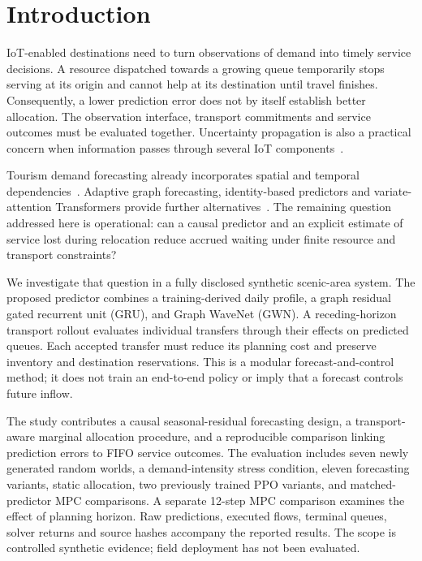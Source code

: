 \section{Introduction}
IoT-enabled destinations need to turn observations of demand into timely service decisions. A resource dispatched towards a growing queue temporarily stops serving at its origin and cannot help at its destination until travel finishes. Consequently, a lower prediction error does not by itself establish better allocation. The observation interface, transport commitments and service outcomes must be evaluated together. Uncertainty propagation is also a practical concern when information passes through several IoT components~\citep{pal2024}.

Tourism demand forecasting already incorporates spatial and temporal dependencies~\citep{law2019,li2022,zhou2023,liang2025}. Adaptive graph forecasting, identity-based predictors and variate-attention Transformers provide further alternatives~\citep{wu2019,shao2022,liu2024}. The remaining question addressed here is operational: can a causal predictor and an explicit estimate of service lost during relocation reduce accrued waiting under finite resource and transport constraints?

We investigate that question in a fully disclosed synthetic scenic-area system. The proposed predictor combines a training-derived daily profile, a graph residual gated recurrent unit (GRU), and Graph WaveNet (GWN). A receding-horizon transport rollout evaluates individual transfers through their effects on predicted queues. Each accepted transfer must reduce its planning cost and preserve inventory and destination reservations. This is a modular forecast-and-control method; it does not train an end-to-end policy or imply that a forecast controls future inflow.

The study contributes a causal seasonal-residual forecasting design, a transport-aware marginal allocation procedure, and a reproducible comparison linking prediction errors to FIFO service outcomes. The evaluation includes seven newly generated random worlds, a demand-intensity stress condition, eleven forecasting variants, static allocation, two previously trained PPO variants, and matched-predictor MPC comparisons. A separate 12-step MPC comparison examines the effect of planning horizon. Raw predictions, executed flows, terminal queues, solver returns and source hashes accompany the reported results. The scope is controlled synthetic evidence; field deployment has not been evaluated.

